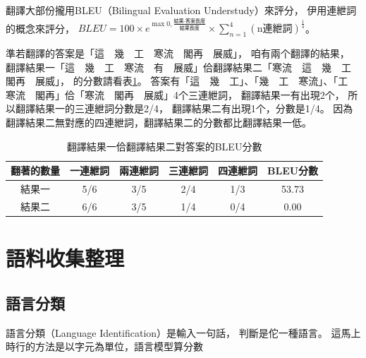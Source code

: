 翻譯大部份攏用BLEU（Bilingual Evaluation Understudy）來評分，
伊用連紲詞的概念來評分，
$BLEU=100\times{e^{\max{0,\frac{\textit{結果-答案長度}}{\textit{結果長度}}}}}\times{\sum_{n=1}^{4}(\textrm{n連紲詞})^{\frac{1}{4}}}$\cite{BLEU程式}。

準若翻譯的答案是「這　幾　工　寒流　閣再　展威」，
咱有兩个翻譯的結果，
翻譯結果一「這　幾　工　寒流　有　展威」佮翻譯結果二「寒流　這　幾　工　閣再　展威」，
的分數請看表\ref{表：範例BLEU分數}。
答案有「這　幾　工」、「幾　工　寒流」、「工　寒流　閣再」佮「寒流　閣再　展威」4个三連紲詞，
翻譯結果一有出現2个，
所以翻譯結果一的三連紲詞分數是2/4，
翻譯結果二有出現1个，分數是1/4。
因為翻譯結果二無對應的四連紲詞，翻譯結果二的分數都比翻譯結果一低。

\begin{table}
\caption{翻譯結果一佮翻譯結果二對答案的BLEU分數}
\label{表：範例BLEU分數}
\centering
\begin{tabular}{|c|cccc|c|}
\hline
翻著的數量 & 一連紲詞 & 兩連紲詞 & 三連紲詞 & 四連紲詞 & BLEU分數\\
\hline
結果一 & 5/6 & 3/5 & 2/4 & 1/3 & 53.73\\
\hline
結果二 & 6/6 & 3/5 & 1/4 & 0/4 & 0.00\\
\hline
\end{tabular}
\end{table}

\section{語料收集整理}
\label{節：語料收集整理}
%
%
%

\subsection{語言分類}
\label{小節：語言分類}
語言分類（Language Identification）是輸入一句話，
判斷是佗一種語言。
這馬上時行的方法是以字元為單位，語言模型算分數\cite{cavnar1994n}

